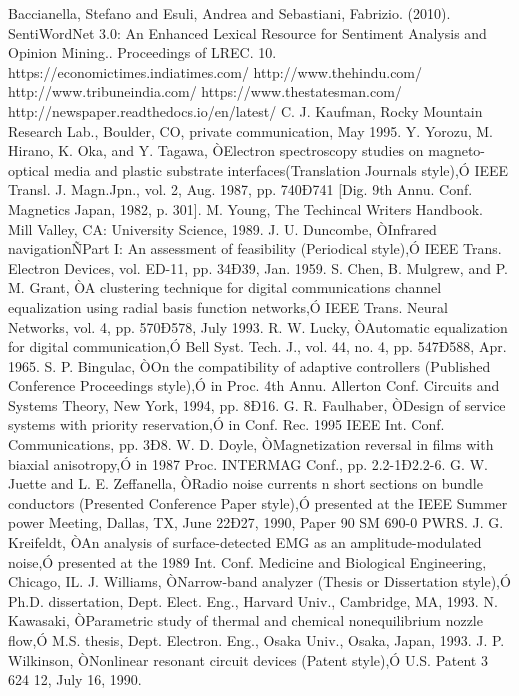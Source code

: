 \documentclass[a4paper, 10pt, conference]{ieeeconf}      %
\begin{document}
\begin{thebibliography}{99}
Baccianella, Stefano and Esuli, Andrea and Sebastiani, Fabrizio. (2010). SentiWordNet 3.0: An Enhanced Lexical Resource for Sentiment Analysis and Opinion Mining.. Proceedings of LREC. 10.
https://economictimes.indiatimes.com/
http://www.thehindu.com/
http://www.tribuneindia.com/
https://www.thestatesman.com/
 http://newspaper.readthedocs.io/en/latest/
 C. J. Kaufman, Rocky Mountain Research Lab., Boulder, CO, private communication, May 1995.
 Y. Yorozu, M. Hirano, K. Oka, and Y. Tagawa, ÒElectron spectroscopy studies on magneto-optical media and plastic substrate interfaces(Translation Journals style),Ó IEEE Transl. J. Magn.Jpn., vol. 2, Aug. 1987, pp. 740Ð741 [Dig. 9th Annu. Conf. Magnetics Japan, 1982, p. 301].
 M. Young, The Techincal Writers Handbook.  Mill Valley, CA: University Science, 1989.
 J. U. Duncombe, ÒInfrared navigationÑPart I: An assessment of feasibility (Periodical style),Ó IEEE Trans. Electron Devices, vol. ED-11, pp. 34Ð39, Jan. 1959.
 S. Chen, B. Mulgrew, and P. M. Grant, ÒA clustering technique for digital communications channel equalization using radial basis function networks,Ó IEEE Trans. Neural Networks, vol. 4, pp. 570Ð578, July 1993.
 R. W. Lucky, ÒAutomatic equalization for digital communication,Ó Bell Syst. Tech. J., vol. 44, no. 4, pp. 547Ð588, Apr. 1965.
 S. P. Bingulac, ÒOn the compatibility of adaptive controllers (Published Conference Proceedings style),Ó in Proc. 4th Annu. Allerton Conf. Circuits and Systems Theory, New York, 1994, pp. 8Ð16.
 G. R. Faulhaber, ÒDesign of service systems with priority reservation,Ó in Conf. Rec. 1995 IEEE Int. Conf. Communications, pp. 3Ð8.
 W. D. Doyle, ÒMagnetization reversal in films with biaxial anisotropy,Ó in 1987 Proc. INTERMAG Conf., pp. 2.2-1Ð2.2-6.
 G. W. Juette and L. E. Zeffanella, ÒRadio noise currents n short sections on bundle conductors (Presented Conference Paper style),Ó presented at the IEEE Summer power Meeting, Dallas, TX, June 22Ð27, 1990, Paper 90 SM 690-0 PWRS.
 J. G. Kreifeldt, ÒAn analysis of surface-detected EMG as an amplitude-modulated noise,Ó presented at the 1989 Int. Conf. Medicine and Biological Engineering, Chicago, IL.
 J. Williams, ÒNarrow-band analyzer (Thesis or Dissertation style),Ó Ph.D. dissertation, Dept. Elect. Eng., Harvard Univ., Cambridge, MA, 1993. 
 N. Kawasaki, ÒParametric study of thermal and chemical nonequilibrium nozzle flow,Ó M.S. thesis, Dept. Electron. Eng., Osaka Univ., Osaka, Japan, 1993.
 J. P. Wilkinson, ÒNonlinear resonant circuit devices (Patent style),Ó U.S. Patent 3 624 12, July 16, 1990. 






\end{thebibliography}
\end{document}

